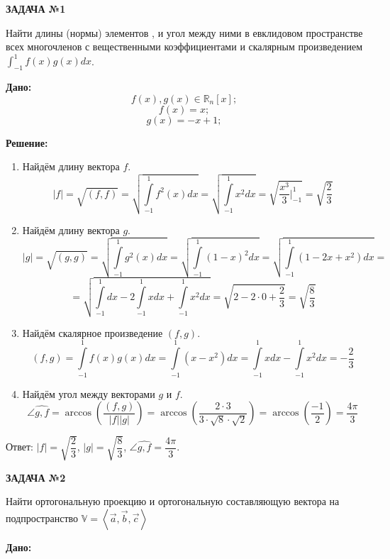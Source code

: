 \documentclass[a4paper]{article}
\begin{document}
	\begin{center}
		\textbf{ЗАДАЧА №1}
	\end{center}
	\par
	Найти длины (нормы) элементов , и угол между ними в евклидовом пространстве 
	всех многочленов с вещественными коэффициентами
	и скалярным произведением $\int_{-1}^{1} f(x)g(x)dx$.
	\par
	\textbf{Дано:}\\
	$$f(x), g(x) \in \mathbb{R}_{n}[x];$$
	$$f(x)=x;$$
	$$g(x)=-x+1;$$
	\par
	\textbf{Решение:}
	\begin{enumerate}
		\item Найдём длину вектора $f$.
		$$|f|=\sqrt{(f, f)}=\sqrt{\int\limits_{-1}^{1} f^{2}(x)dx}=\sqrt{\int\limits_{-1}^{1} x^{2}dx}=\sqrt{\dfrac{x^3}{3}\bigg|_{-1}^{1}}=\sqrt{\dfrac{2}{3}}$$
		\item Найдём длину вектора $g$.
		$$|g|=\sqrt{(g, g)}=\sqrt{\int\limits_{-1}^{1} g^{2}(x)dx}=\sqrt{\int\limits_{-1}^{1} (1-x)^2dx}=\sqrt{\int\limits_{-1}^{1} (1-2x+x^2)dx}=$$
		$$=\sqrt{\int\limits_{-1}^{1}dx-2\int\limits_{-1}^{1}xdx + \int\limits_{-1}^{1}x^2dx}=\sqrt{2-2\cdot0+\dfrac{2}{3}}=\sqrt{\dfrac{8}{3}}$$
		\item Найдём скалярное произведение $(f, g)$.
		$$(f, g)=\int\limits_{-1}^{1} f(x)g(x)dx=\int\limits_{-1}^{1}(x-x^2)dx=\int\limits_{-1}^{1}xdx - \int\limits_{-1}^{1}x^2dx=-\dfrac{2}{3}$$
		\item Найдём угол между векторами $g$ и $f$.
		$$\angle\widehat{g, f} = \arccos(\dfrac{(f, g)}{|f||g|}) = \arccos(\dfrac{2\cdot3}{3\cdot\sqrt{8}\cdot\sqrt{2}})=\arccos(\dfrac{-1}{2})=\dfrac{4\pi}{3}$$
	\end{enumerate}
	\par
	Ответ: $|f|=\sqrt{\dfrac{2}{3}}$, $|g|=\sqrt{\dfrac{8}{3}}$, $\angle\widehat{g, f} = \dfrac{4\pi}{3}$.
	\pagebreak
	\begin{center}
		\textbf{ЗАДАЧА №2}
	\end{center}
\par
	Найти ортогональную проекцию и ортогональную составляющую 
	вектора на подпространство $\mathbb{V}=\left\langle{ \overrightarrow{a},\overrightarrow{b},\overrightarrow{c}}\right\rangle$
		\par
	\textbf{Дано:}
\end{document}
